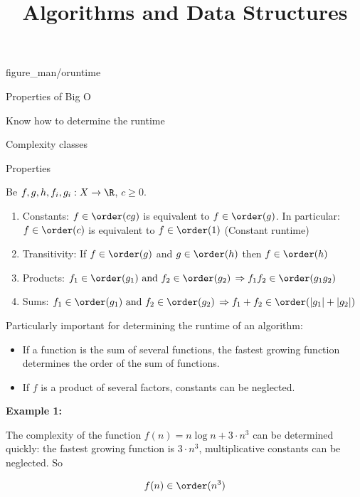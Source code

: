 \documentclass[11pt,compress,t,notes=noshow, xcolor=table]{beamer}
\title{Algorithms and Data Structures}
\begin{document}
{figure_man/oruntime}
{
  \item Properties of Big O
  \item Know how to determine the runtime
  \item Complexity classes
}


\begin{vbframe}{Properties}

Be $f, g, h, f_i, g_i: X \to \R$, $c \ge 0$.

\begin{enumerate}
  \item Constants: $f \in \order(c g)$ is equivalent to $f \in \order(g)$. In particular: $f \in \order(c)$ is equivalent to $f \in \order(1)$ (Constant runtime)
  \item Transitivity: If $f \in \order(g)$ and $g \in \order(h)$ then $f \in \order(h)$
  \item Products: $f_{1} \in \order(g_{1}){\text{ and }}f_{2} \in \order(g_{2})\,\Rightarrow f_{1}f_{2} \in \order(g_{1}g_{2})$
  \item Sums: $f_{1}\in \order(g_{1}){\text{ and }}f_{2} \in \order(g_{2})\,\Rightarrow f_{1}+f_{2} \in \order(|g_{1}|+|g_{2}|)$
\end{enumerate}

\vfill

\framebreak

Particularly important for determining the runtime of an algorithm:
\begin{itemize}
   \item If a function is the sum of several functions, the fastest growing function determines the order of the sum of functions.
  \item If $f$ is a product of several factors, constants can be neglected.
\end{itemize}

\lz

\textbf{Example 1: }

The complexity of the function $f(n) = n \log n + 3 \cdot n^3$ can be determined quickly: the fastest growing function is $3 \cdot n^3$, multiplicative constants can be neglected. So

$$
f(n) \in \order(n^3)
$$

\end{vbframe}
\end{document}
